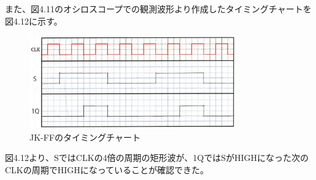 \documentclass{jlreq}
\numberwithin{equation}{section}
\begin{document}
また、図4.11のオシロスコープでの観測波形より作成したタイミングチャートを図4.12に示す。

\begin{figure}[H]
  \centering
  \includegraphics[width=0.8\textwidth]{assets/jkffchart.png}
  \caption{JK-FFのタイミングチャート}
\end{figure}

図4.12より、SではCLKの4倍の周期の矩形波が、1QではSがHIGHになった次のCLKの周期でHIGHになっていることが確認できた。
\end{document}
